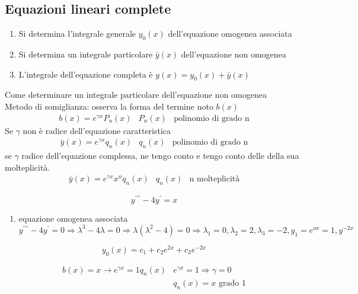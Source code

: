 \subsection{Equazioni lineari complete}
\begin{enumerate}
\item Si determina l'integrale generale $y_0(x)$ dell'equazione omogenea associata
\item Si determina un integrale particolare $\bar{y}(x)$ dell'equazione non omogenea
  \item L'integrale dell'equazione completa è $y(x)=y_0(x)+\bar{y}(x)$
\end{enumerate}
Come determinare un integrale particolare dell'equazione non omogenea\\
Metodo di somiglianza: osserva la forma del termine noto $b(x)$
\begin{eqnarray*}
	b(x)=e^{\gamma x} P_n(x) & P_n(x) &\text{polinomio di grado n}
\end{eqnarray*}
Se $\gamma$ non è radice dell'equazione caratteristica
\begin{eqnarray*}
	\bar{y} (x)=e^{\gamma x} q_n(x) & q_n(x)& \text{polinomio di grado n}
\end{eqnarray*}
se $\gamma$ radice dell'equazione complessa, ne tengo conto e tengo conto delle
della sua molteplicità.
\begin{eqnarray*}
	\bar{y} (x)=e^{\gamma x} x^n q_n(x) & q_n(x) & \text{n molteplicità}
\end{eqnarray*}
\begin{esempio}
	\begin{equation*}
		y^{\prime\prime\prime}-4y^{\prime} =x
	\end{equation*}
	\begin{enumerate}
		\item equazione omogenea associata
			$y^{\prime\prime\prime}-4y^{\prime}=0 \Rightarrow \lambda^3
			-4\lambda =0 \Rightarrow \lambda(\lambda^2-4)=0 \Rightarrow
			\lambda_1=0,\lambda_2=2,\lambda_3=-2,y_1=e^{ox}=1,y^{-2x}$
	\end{enumerate}
	\begin{equation*}
		y_0(x)=c_1+c_2e^{2x}+c_3e^{-2x}
	\end{equation*}
\end{esempio}
\clearpage
\begin{eqnarray*}
	b(x)=x\to e^{\gamma x}=1 q_n(x) & e^{\gamma x}=1 \Rightarrow \gamma=0\\
	&q_n(x)=x \text{ grado 1}
\end{eqnarray*}

